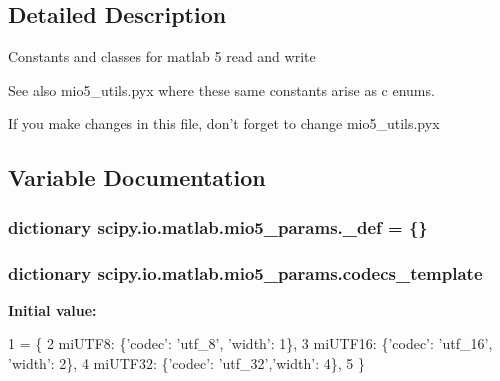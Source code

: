 \subsection{Detailed Description}
\begin{DoxyVerb}Constants and classes for matlab 5 read and write

See also mio5_utils.pyx where these same constants arise as c enums.

If you make changes in this file, don't forget to change mio5_utils.pyx
\end{DoxyVerb}
 

\subsection{Variable Documentation}
\hypertarget{namespacescipy_1_1io_1_1matlab_1_1mio5__params_a7128d54c31e45411986e68f445610b53}{}
\subsubsection[{\+\_\+def}]{\setlength{\rightskip}{0pt plus 5cm}dictionary scipy.\+io.\+matlab.\+mio5\+\_\+params.\+\_\+def = \{\}}\label{namespacescipy_1_1io_1_1matlab_1_1mio5__params_a7128d54c31e45411986e68f445610b53}
\hypertarget{namespacescipy_1_1io_1_1matlab_1_1mio5__params_a9f5430938191f6465d951eec1014c1cf}{}
\subsubsection[{codecs\+\_\+template}]{\setlength{\rightskip}{0pt plus 5cm}dictionary scipy.\+io.\+matlab.\+mio5\+\_\+params.\+codecs\+\_\+template}\label{namespacescipy_1_1io_1_1matlab_1_1mio5__params_a9f5430938191f6465d951eec1014c1cf}
{\bfseries Initial value\+:}
\begin{DoxyCode}
1 = \{
2     miUTF8: \{\textcolor{stringliteral}{'codec'}: \textcolor{stringliteral}{'utf\_8'}, \textcolor{stringliteral}{'width'}: 1\},
3     miUTF16: \{\textcolor{stringliteral}{'codec'}: \textcolor{stringliteral}{'utf\_16'}, \textcolor{stringliteral}{'width'}: 2\},
4     miUTF32: \{\textcolor{stringliteral}{'codec'}: \textcolor{stringliteral}{'utf\_32'},\textcolor{stringliteral}{'width'}: 4\},
5     \}
\end{DoxyCode}
\hypertarget{namespacescipy_1_1io_1_1matlab_1_1mio5__params_a9357fae402de167deba8baced179d6dc}{}
